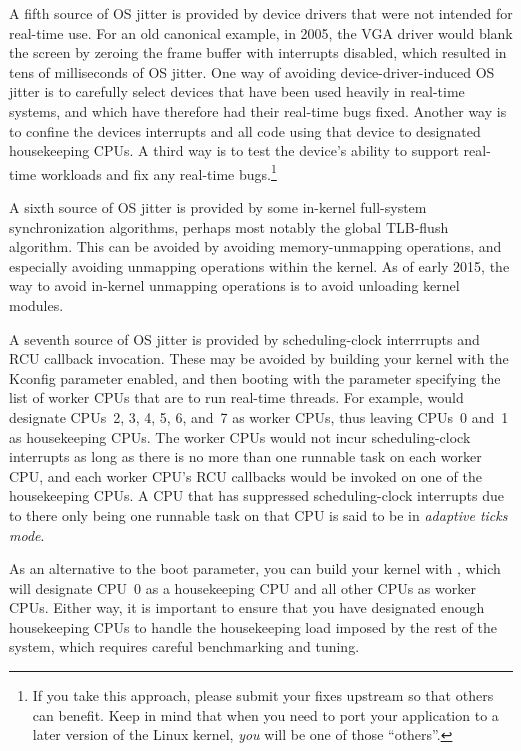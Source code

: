 A fifth source of OS jitter is provided by device drivers that were
not intended for real-time use.
For an old canonical example, in 2005, the VGA driver would blank
the screen by zeroing the frame buffer with interrupts disabled,
which resulted in tens of milliseconds of OS jitter.
One way of avoiding device-driver-induced OS jitter is to carefully
select devices that have been used heavily in real-time systems,
and which have therefore had their real-time bugs fixed.
Another way is to confine the devices interrupts and all code using
that device to designated housekeeping CPUs.
A third way is to test the device's ability to support real-time
workloads and fix any real-time bugs.\footnote{
	If you take this approach, please submit your fixes upstream
	so that others can benefit.
	Keep in mind that when you need to port your application to
	a later version of the Linux kernel, \emph{you} will be one of those
	``others''.}

A sixth source of OS jitter is provided by some in-kernel
full-system synchronization algorithms, perhaps most notably
the global TLB-flush algorithm.
This can be avoided by avoiding memory-unmapping operations, and especially
avoiding unmapping operations within the kernel.
As of early 2015, the way to avoid in-kernel
unmapping operations is to avoid unloading kernel modules.

A seventh source of OS jitter is provided by
scheduling-clock interrrupts and RCU callback invocation.
These may be avoided by building your kernel with the
 Kconfig parameter enabled, and then booting
with the  parameter specifying the list of
worker CPUs that are to run real-time threads.
For example,  would designate CPUs~2, 3, 4, 5, 6, and~7
as worker CPUs, thus leaving CPUs~0 and~1 as housekeeping CPUs.
The worker CPUs would not incur scheduling-clock interrupts as long
as there is no more than one runnable task on each worker CPU,
and each worker CPU's RCU callbacks would be invoked on one of the
housekeeping CPUs.
A CPU that has suppressed scheduling-clock interrupts due to there
only being one runnable task on that CPU is said to be in
\emph{adaptive ticks mode}.

As an alternative to the  boot parameter, you can build
your kernel with , which will designate CPU~0 as
a housekeeping CPU and all other CPUs as worker CPUs.
Either way, it is important to ensure that you have designated enough
housekeeping CPUs to handle the housekeeping load imposed by the
rest of the system, which requires careful benchmarking and tuning.

